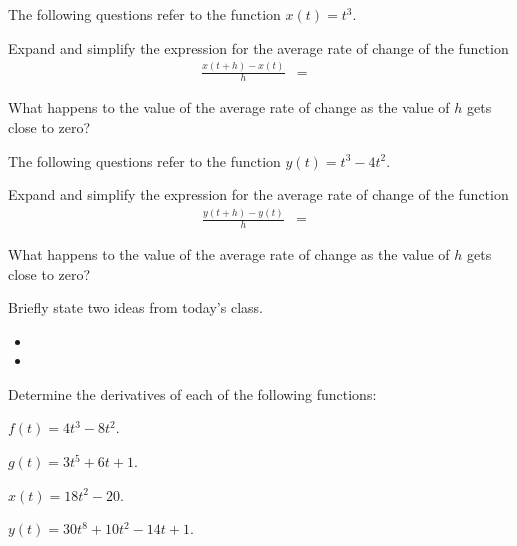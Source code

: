 \begin{problem}
    \clearpage

  \item The following questions refer to the function $x(t)=t^3$.
    \begin{subproblem}
    \item Expand and simplify the expression for the average rate of
      change of the function
      \begin{eqnarray*}
        \frac{x(t+h)-x(t)}{h} & = & 
      \end{eqnarray*}
      \vspace{3em}
    \item What happens to the value of the average rate of change as
      the value of $h$ gets close to zero?
      \vspace{3em}
    \end{subproblem}

  \item The following questions refer to the function $y(t)=t^3-4t^2$.
    \begin{subproblem}
    \item Expand and simplify the expression for the average rate of
      change of the function
      \begin{eqnarray*}
        \frac{y(t+h)-y(t)}{h} & = & 
      \end{eqnarray*}
      \vspace{3em}
    \item What happens to the value of the average rate of change as
      the value of $h$ gets close to zero?
      \vspace{3em}
    \end{subproblem}


\end{problem}

\postClass

\begin{problem}
\item Briefly state two ideas from today's class.
  \begin{itemize}
  \item 
  \item 
  \end{itemize}
\item Determine the derivatives of each of the following functions:
  \begin{subproblem}
    \item $f(t)=4t^3-8t^2$.
      \vfill
    \item $g(t)=3t^5+6t + 1$.
      \vfill
    \item $x(t)=18t^2-20$.
      \vfill
    \item $y(t)=30t^8+10t^2 - 14 t + 1$.
      \vfill
  \end{subproblem}
\end{problem}



